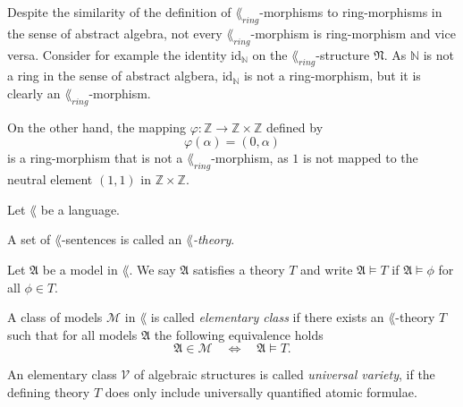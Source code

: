 \begin{rem}
  Despite the similarity of the definition of \(\lang_{ring}\)-morphisms to
  ring-morphisms in the sense of abstract algebra, not every
  \(\lang_{ring}\)-morphism is ring-morphism and vice versa. Consider for
  example the identity \(\mathrm{id}_ℕ\) on the \(\lang_{ring}\)-structure
  \(\mathfrak{N}\). As \(ℕ\) is not a ring in the sense of abstract algbera,
  \(\mathrm{id}_ℕ\) is not a ring-morphism, but it is clearly an
  \(\lang_{ring}\)-morphism.

  On the other hand, the mapping \(φ: ℤ → ℤ \times ℤ\) defined by
  \[
    φ(α) = (0, α)
  \]
  is a ring-morphism that is not a \(\lang_{ring}\)-morphism, as \(1\) is not
  mapped to the neutral element \((1, 1)\) in \(ℤ \times ℤ\).
\end{rem}

\begin{defin}
  Let \(\lang\) be a language.
  \begin{thmlist}
    \item A set of \(\lang\)-sentences is called an \emph{\(\lang\)-theory}.

    \item Let \(\mathfrak{A}\) be a model in \(\lang\). We say \(\mathfrak{A}\)
    satisfies a theory \(T\) and write \(\mathfrak{A} \models T\) if
    \(\mathfrak{A} \models ϕ\) for all \(ϕ ∈ T\).

    \item A class of models \(\mathcal{M}\) in \(\lang\) is called
    \emph{elementary class} if there exists an \(\lang\)-theory \(T\) such that
    for all models
    \(\mathfrak{A}\) the following equivalence holds
    \[
      \mathfrak{A} ∈ \mathcal{M} \quad ⇔ \quad \mathfrak{A} \models T.
    \]

    \item An elementary class \(\mathcal{V}\) of algebraic structures is called
    \emph{universal variety}, if the defining theory \(T\) does only include
    universally quantified atomic formulae.
  \end{thmlist}
\end{defin}

